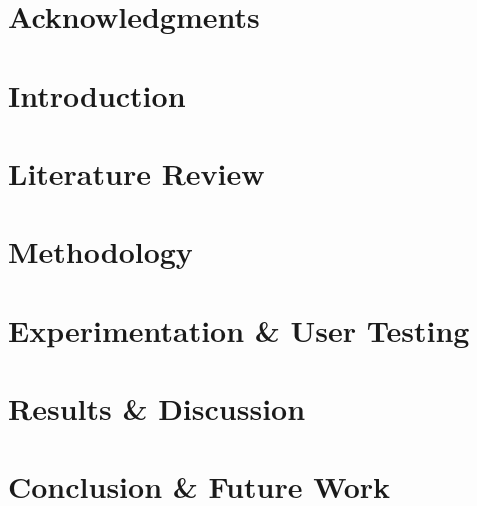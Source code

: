\documentclass[a4paper,11pt,oneside,openany]{styles/ioniothesis}
\begin{document}
\cleardoublepage

\chapter*{Acknowledgments} \pagestyle{headings}



\cleardoublepage

\tableofcontents
\cleardoublepage


\listoffigures
\cleardoublepage
\listoftables

\setlength{\parskip}{5pt}


\pagestyle{headings}
\cleardoublepage


\newpage
{}


\cleardoublepage


\chapter{Introduction} \label{chapter:intro}



\chapter{Literature Review} \label{chapter:literature}



\chapter{Methodology} \label{chapter:methodology}



\chapter{Experimentation \& User Testing} \label{chapter:experiments}



\chapter{Results \& Discussion} \label{chapter:results}



\chapter{Conclusion \& Future Work} \label{chapter:conclusion}

\end{document}
